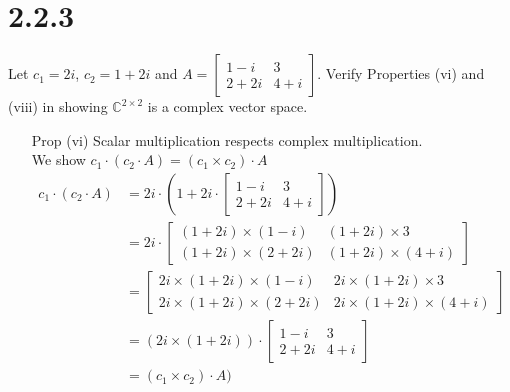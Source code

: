 \documentclass[11pt]{article}
\begin{document}
\section{2.2.3} Let $c_1 = 2i$, $c_2 = 1 + 2i$ and 
$A = \begin{bmatrix}1 - i & 3 \\ 2+2i & 4+i  \end{bmatrix}$.  
	Verify Properties (vi) and (viii) in showing $\mathbb{C}^{2 \times 2}$ is a complex vector space.\\
	\begin{enumerate}
		\item[Prop (vi)] Scalar multiplication respects complex multiplication. \\
			We show $c_1 \cdot (c_2 \cdot A) = (c_1 \times c_2) \cdot A$ 
			\begin{align*}
				c_1 \cdot (c_2 \cdot A) &= 2i \cdot (1+2i \cdot 
				\begin{bmatrix} 1 - i & 3 \\ 2+2i & 4+i  \end{bmatrix})  \\
							&= 2i \cdot 
				\begin{bmatrix} (1+2i) \times (1 - i) & (1+2i) \times 3 \\ 
				(1+2i) \times (2+2i) & (1+2i) \times (4+i)  \end{bmatrix} \\
							&= 
							\begin{bmatrix} 2i \times (1+2i) \times (1 - i) 
								& 2i \times (1+2i) \times 3 \\ 
								2i \times (1+2i) \times (2+2i) 
							& 2i \times (1+2i) \times (4+i)  
							\end{bmatrix} \\
							&= (2i \times (1+2i)) \cdot \begin{bmatrix}1 - i & 3 \\ 2+2i & 4+i  \end{bmatrix} \\
							&= (c_1 \times c_2) \cdot A) 
			\end{align*}


\end{enumerate}
\end{document}
